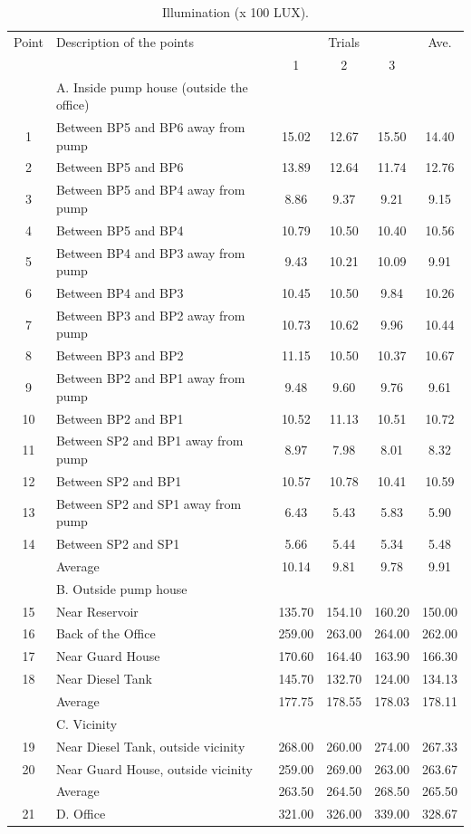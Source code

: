 \begin{table}[h]
	\caption{Illumination (x 100 LUX).}
	\label{ch04_tbl_wem04}
	{\footnotesize
\begin{tabular}{c|l|c|c|c|c}
	\hline
	Point & Description of the points & \multicolumn{3}{c|}{Trials} & Ave. \\ 
	\cline{3-5}
	&  & 1 & 2 & 3 &  \\ 
	\hline
	& A. Inside pump house (outside the office) &  &  &  &  \\ 
	1 & Between BP5 and BP6 away from pump & 15.02 & 12.67 & 15.50 & 14.40 \\ 
	2 & Between BP5 and BP6 & 13.89 & 12.64 & 11.74 & 12.76 \\ 
	3 & Between BP5 and BP4 away from pump & 8.86 & 9.37 & 9.21 & 9.15 \\ 
	4 & Between BP5 and BP4 & 10.79 & 10.50 & 10.40 & 10.56 \\ 
	5 & Between BP4 and BP3 away from pump & 9.43 & 10.21 & 10.09 & 9.91 \\ 
	6 & Between BP4 and BP3 & 10.45 & 10.50 & 9.84 & 10.26 \\ 
	7 & Between BP3 and BP2 away from pump & 10.73 & 10.62 & 9.96 & 10.44 \\ 
	8 & Between BP3 and BP2 & 11.15 & 10.50 & 10.37 & 10.67 \\ 
	9 & Between BP2 and BP1 away from pump & 9.48 & 9.60 & 9.76 & 9.61 \\ 
	10 & Between BP2 and BP1 & 10.52 & 11.13 & 10.51 & 10.72 \\ 
	11 & Between SP2 and BP1 away from pump & 8.97 & 7.98 & 8.01 & 8.32 \\ 
	12 & Between SP2 and BP1 & 10.57 & 10.78 & 10.41 & 10.59 \\ 
	13 & Between SP2 and SP1 away from pump & 6.43 & 5.43 & 5.83 & 5.90 \\ 
	14 & Between SP2 and SP1 & 5.66 & 5.44 & 5.34 & 5.48 \\ 
	& Average & 10.14 & 9.81 & 9.78 & 9.91 \\ 
	\hline
	& B. Outside pump house &  &  &  &  \\ 
	15 & Near Reservoir & 135.70 & 154.10 & 160.20 & 150.00 \\ 
	16 & Back of the Office & 259.00 & 263.00 & 264.00 & 262.00 \\ 
	17 & Near Guard House & 170.60 & 164.40 & 163.90 & 166.30 \\ 
	18 & Near Diesel Tank & 145.70 & 132.70 & 124.00 & 134.13 \\ 
	& Average & 177.75 & 178.55 & 178.03 & 178.11 \\ 
	\hline
	& C. Vicinity &  &  &  &  \\ 
	19 & Near Diesel Tank, outside vicinity & 268.00 & 260.00 & 274.00 & 267.33 \\ 
	20 & Near Guard House, outside vicinity & 259.00 & 269.00 & 263.00 & 263.67 \\ 
	& Average & 263.50 & 264.50 & 268.50 & 265.50 \\ 
	21 & D. Office & 321.00 & 326.00 & 339.00 & 328.67 \\ 
	\hline
\end{tabular}

	}
\end{table}


